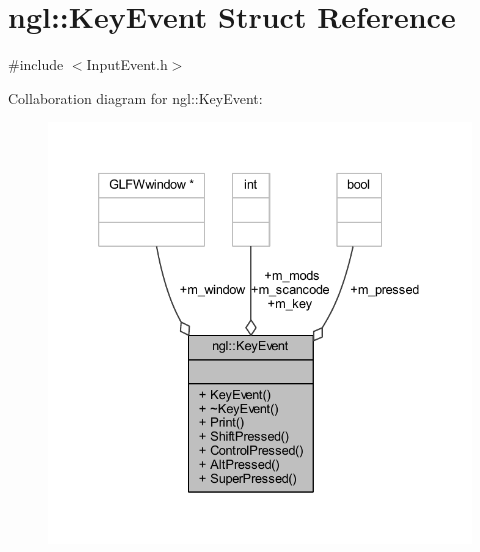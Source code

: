 \hypertarget{structngl_1_1_key_event}{}\section{ngl\+:\+:Key\+Event Struct Reference}
\label{structngl_1_1_key_event}


{\ttfamily \#include $<$Input\+Event.\+h$>$}



Collaboration diagram for ngl\+:\+:Key\+Event\+:
\nopagebreak
\begin{figure}[H]
\begin{center}
\leavevmode
\includegraphics[width=333pt]{structngl_1_1_key_event__coll__graph}
\end{center}
\end{figure}

